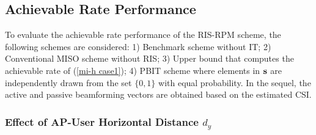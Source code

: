 \documentclass[draftclsnofoot,onecolumn,12pt]{IEEEtran}
\newcommand{\revh}[1]{{\color{black}#1}} %
\newcommand{\revh}[1]{#1}
\begin{document}
\subsection{Achievable Rate Performance}

To evaluate the achievable rate performance of the RIS-RPM scheme, the following schemes are considered: 1) Benchmark scheme without IT; 2) Conventional MISO scheme without RIS; 3) Upper bound that computes the achievable rate of (\ref{mi-h case1})\revh{; 4) PBIT scheme where elements in $\bf s$ are independently drawn from the set $\{0,1\}$ with equal probability.} 
In the sequel, the active and passive beamforming vectors are obtained based on the estimated CSI. 


\subsubsection{Effect of AP-User Horizontal Distance $d_y$}
\end{document}
